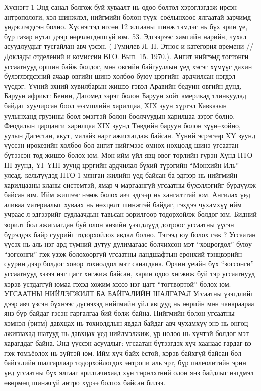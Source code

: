 Хүснэгт 1
Энд санал болгож буй хуваалт нь одоо болтол хэрэглэгдэж ирсэн антропологи, хэл шинжлэл, нийгмийн болон түүх–соёлынхоос ялгаатай зарчимд үндэслэгдсэн болно. Хүснэгтэд өгсөн 12 ялгааны шинж тэмдэг нь бүх эрин үе, бүр газар нутаг дээр өөрчлөгдөшгүй юм. 53. Эдгээрээс хамгийн нарийн, чухал асуудлуудыг тусгайлан авч үзсэн. ( Гумилев Л. Н. Этнос и категория времени //Доклады отделений и комиссии ВГО. Вып. 15. 1970.).
Ангит нийгэмд тогтонги угсаатнууд оршин байж болдог, мөн овгийн байгууллын үед хэсэг хүмүүс дахин бүлэглэгдсэний ачаар овгийн шинэ холбоо буюу цэргийн–ардчилсан нэгдэл үүсдэг. Үүний эхний хувилбарын жишээ гэвэл Аравийн бедуин овгийн дунд, Баруун африкт: Бенин, Дагомед зэрэг болон Баруун хойт америкад тлинкуудад байдаг хуучирсан боол эзэмшлийн харилцаа, XIX зуун хүртэл Кавказын уулынханд грузины боол эмэгтэй болон боолчуудын харилцаа зэрэг болно. Феодалын царцанги харилцаа XIX зуунд Төвдийн баруун болон зүүн–хойно, уулын Дагестан, якут, малайз нарт ажиглагдаж байсан. Үүний эсрэгээр XY зуунд үүссэн ирокезийн холбоо бол ангит нийгмээс өмнөх нөхцөлд шинэ угсаатан бүтээсэн тод жишээ болох юм. Мөн ийм үйл явц овог төрлийн гүрэн Хүнд НТӨ III зуунд, YI–YIII зуунд цэргийн ардчилал бүхий түрэгийн “Мөнхийн Иль” улсад, кельтүүдэд НТӨ 1 мянган жилийн үед байсан ба эдгээр нь нийгмийн харилцааны кланы системтэй, ямар ч маргаангүй угсаатны бүхэллэгийг бүрдүүлж байсан юм.
Ийм жишээг нэмж болох авч эдгээр нь хангалттай юм. Ангилах үед аливаа материалыг хуваах нь нөхцөлт шинжтэй байдаг, гэхдээ чухамхүү ийм учраас л эдгээрийг судлаачдын тавьсан зорилгоор тодорхойлж болдог юм. Бидний зорилт бол ажиглагдан буй олон янзийн үзэгдлүүд дотроос угсаатны үүсэн бүрэлдэх байр суурийг тодорхойлох явдал болно. Тэгээд юу болох гэж ? Угсаатан үүсэх нь аль нэг ард түмний дутуу дулимагаас болчихсон мэт “хоцрогдол” буюу “зогсонги” гэж үзэж болохооргүй угсаатны ландшафтын ерөнхий тэнцвэрийн суурин дээр болдог ховор тохиолдол мэт санагдана. Орчин үеийн бүх “зогсонги” угсаатнууд хэзээ нэг цагт хөгжиж байсан, харин одоо хөгжиж буй тэр угсаатнууд хэрэв устдаггүй юмаа гэхэд хожим хэзээ нэг цагт “тогтвортой” болох юм.
УГСААТНЫ НИЙЛЭГЖИЛТ БА БАЙГАЛИЙН ШАЛГАРАЛ
Угсаатны үзэгдлийг дээр авч үзсэн бүхнээс дүгнэхэд нийгмийн үйл явцууд нь өөрийн мөн чанараараа янз бүр байдаг гэсэн гаргалгаа бий болж байна. Нийгмийн болон угсаатны хэмнэл (ритм) давхцах нь тохиолдлын явдал байдаг авч чухамхүү энэ нь өнгөц ажиглахад шатууд нь давхцах үед нийлмэлжиж, үр нөлөө нь хүчтэй болдог мэт харагддаг байна. Энд үүссэн асуудлыг: угсаатан бүтээгдэх хүч хаанаас гардаг вэ гэж томъёолох нь зүйтэй юм. Ийм хүч байх ёстой, хэрэв байхгүй байсан бол байгалийн шалгарлаар тодорхойлогдох энтропи аль эрт, бүр палеолитийн эрин үед угсаатны бүх ялгааг арилгачихаад хүн төрөлхтний олон янз байдлыг нэгдмэл өвөрмөц шинжгүй антро хүрээ болгох байсан билээ.
